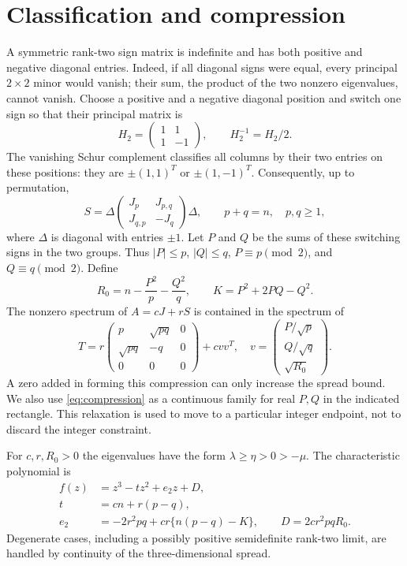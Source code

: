 \documentclass[11pt]{article}
\newcommand{\J}{J}
\begin{document}
\section{Classification and compression}
A symmetric rank-two sign matrix is indefinite and has both positive and
negative diagonal entries. Indeed, if all diagonal signs were equal, every
principal $2\times2$ minor would vanish; their sum, the product of the two
nonzero eigenvalues, cannot vanish. Choose a positive and a negative diagonal
position and switch one sign so that their principal matrix is
\[
 H_2=\begin{pmatrix}1&1\\1&-1\end{pmatrix},\qquad H_2^{-1}=H_2/2.
\]
The vanishing Schur complement classifies all columns by their two entries
on these positions: they are $\pm(1,1)^T$ or $\pm(1,-1)^T$. Consequently,
up to permutation,
\begin{equation}\label{eq:class}
 S=\Delta\begin{pmatrix}J_p&J_{p,q}\\J_{q,p}&-J_q\end{pmatrix}\Delta,
 \qquad p+q=n,\quad p,q\ge1,
\end{equation}
where $\Delta$ is diagonal with entries $\pm1$.
Let $P$ and $Q$ be the sums of these switching signs in the two groups. Thus
$|P|\le p$, $|Q|\le q$, $P\equiv p\pmod2$, and $Q\equiv q\pmod2$.
Define
\[
 R_0=n-\frac{P^2}{p}-\frac{Q^2}{q},\qquad K=P^2+2PQ-Q^2.
\]
The nonzero spectrum of $A=cJ+rS$ is contained in the spectrum of
\begin{equation}\label{eq:compression}
 T=r\begin{pmatrix}p&\sqrt{pq}&0\\\sqrt{pq}&-q&0\\0&0&0\end{pmatrix}
      +cvv^T,
 \quad v=\begin{pmatrix}P/\sqrt p\\Q/\sqrt q\\\sqrt{R_0}\end{pmatrix}.
\end{equation}
A zero added in forming this compression can only increase the spread bound.
We also use \eqref{eq:compression} as a continuous family for real $P,Q$ in
the indicated rectangle. This relaxation is used to move to a particular
integer endpoint, not to discard the integer constraint.

For $c,r,R_0>0$ the eigenvalues have the form
$\lambda\ge\eta>0>-\mu$. The characteristic polynomial is
\begin{align}
 f(z)&=z^3-tz^2+e_2z+D,\label{eq:cubic}\\
 t&=cn+r(p-q),\nonumber\\
 e_2&=-2r^2pq+cr\{n(p-q)-K\},\qquad D=2cr^2pqR_0.\nonumber
\end{align}
Degenerate cases, including a possibly positive semidefinite rank-two limit,
are handled by continuity of the three-dimensional spread.
\end{document}
